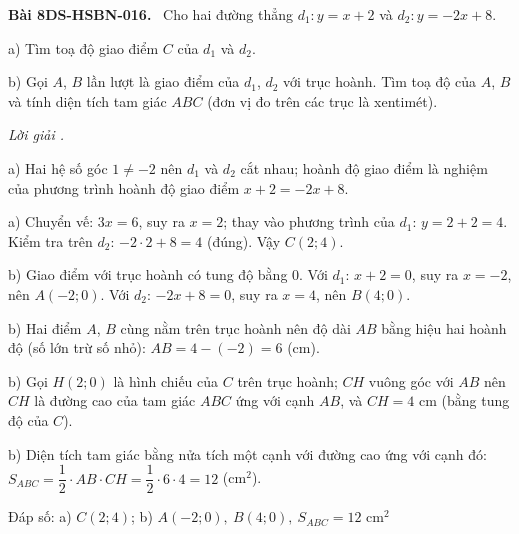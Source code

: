 \documentclass[12pt,a4paper]{article}
\newenvironment{problem}[1][]{\par\medskip\noindent\textbf{Bài #1.}\ }{\par}
\newenvironment{solution}[1][]{\par\noindent\textit{Lời giải #1.}\par}{\par}
\begin{document}
\begin{problem}[8DS-HSBN-016]
Cho hai đường thẳng $d_1: y = x + 2$ và $d_2: y = -2x + 8$.

a) Tìm toạ độ giao điểm $C$ của $d_1$ và $d_2$.

b) Gọi $A$, $B$ lần lượt là giao điểm của $d_1$, $d_2$ với trục hoành. Tìm toạ độ của $A$, $B$ và tính diện tích tam giác $ABC$ (đơn vị đo trên các trục là xentimét).

\begin{solution}
a) Hai hệ số góc $1 \neq -2$ nên $d_1$ và $d_2$ cắt nhau; hoành độ giao điểm là nghiệm của phương trình hoành độ giao điểm $x + 2 = -2x + 8$.

a) Chuyển vế: $3x = 6$, suy ra $x = 2$; thay vào phương trình của $d_1$: $y = 2 + 2 = 4$. Kiểm tra trên $d_2$: $-2 \cdot 2 + 8 = 4$ (đúng). Vậy $C(2; 4)$.

b) Giao điểm với trục hoành có tung độ bằng $0$. Với $d_1$: $x + 2 = 0$, suy ra $x = -2$, nên $A(-2; 0)$. Với $d_2$: $-2x + 8 = 0$, suy ra $x = 4$, nên $B(4; 0)$.

b) Hai điểm $A$, $B$ cùng nằm trên trục hoành nên độ dài $AB$ bằng hiệu hai hoành độ (số lớn trừ số nhỏ): $AB = 4 - (-2) = 6$ (cm).

b) Gọi $H(2; 0)$ là hình chiếu của $C$ trên trục hoành; $CH$ vuông góc với $AB$ nên $CH$ là đường cao của tam giác $ABC$ ứng với cạnh $AB$, và $CH = 4$ cm (bằng tung độ của $C$).

b) Diện tích tam giác bằng nửa tích một cạnh với đường cao ứng với cạnh đó: $S_{ABC} = \dfrac{1}{2} \cdot AB \cdot CH = \dfrac{1}{2} \cdot 6 \cdot 4 = 12$ (cm$^2$).

Đáp số: a) $\boxed{C(2; 4)}$; b) $\boxed{A(-2; 0),\ B(4; 0),\ S_{ABC} = 12 \text{ cm}^2}$
\end{solution}
\end{problem}
\end{document}
